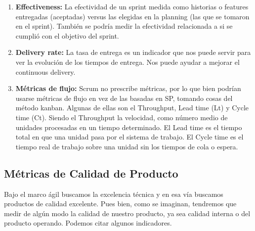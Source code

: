 \begin{enumerate}
\item {\textbf{Effectiveness:} La efectividad de un sprint medida como historias o features entregadas (aceptadas) versus las elegidas en la planning (las que se tomaron en el sprint). También se podría medir la efectividad relacionada a si se cumplió con el objetivo del sprint.
}


\item {\textbf{Delivery rate:} La tasa de entrega es un indicador que nos puede servir para ver la evolución de los tiempos de entrega. Nos puede ayudar a mejorar el continuous delivery.
}

\item {\textbf{Métricas de flujo:} Scrum no prescribe métricas, por lo que bien podrían usarse métricas de flujo en vez de las basadas en SP, tomando cosas del método kanban. Algunas de ellas son el Throughput, Lead time (Lt) y Cycle time (Ct). Siendo el Throughput la velocidad, como número medio de unidades procesadas en un tiempo determinado. El Lead time es el tiempo total en que una unidad pasa por el sistema de trabajo. El Cycle time es el tiempo real de trabajo sobre una unidad sin los tiempos de cola o espera.
}

\end{enumerate}

\subsection{Métricas de Calidad de Producto}

Bajo el marco ágil buscamos la excelencia técnica y en esa vía buscamos productos de calidad excelente. Pues bien, como se imaginan, tendremos que medir de algún modo la calidad de nuestro producto, ya sea calidad interna o del producto operando. Podemos citar algunos indicadores.

